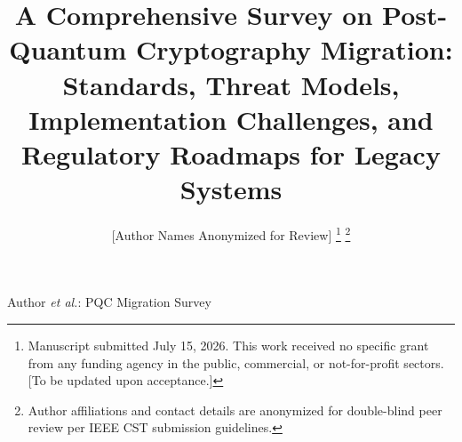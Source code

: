 \documentclass[journal]{IEEEtran}
\begin{document}

\title{A Comprehensive Survey on Post-Quantum Cryptography Migration:\\
Standards, Threat Models, Implementation Challenges, and\\
Regulatory Roadmaps for Legacy Systems}

\author{[Author Names Anonymized for Review]%
\thanks{Manuscript submitted July 15, 2026. This work received no specific grant from any funding agency in the public, commercial, or not-for-profit sectors. [To be updated upon acceptance.]}%
\thanks{Author affiliations and contact details are anonymized for double-blind peer review per IEEE CST submission guidelines.}
}

%
{Author \MakeLowercase{\textit{et al.}}: PQC Migration Survey}

\maketitle
\end{document}
